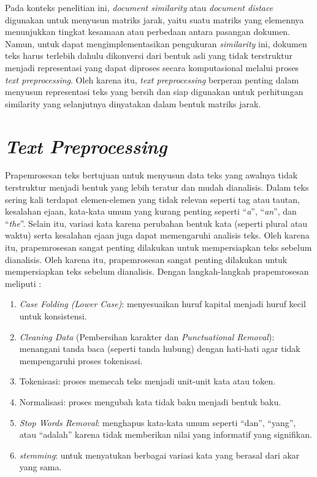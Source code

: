 \documentclass[a4paper,12pt]{report}
\numberwithin{equation}{chapter}
\begin{document}
Pada konteks penelitian ini, \textit{document similarity} atau \textit{document distace} digunakan untuk menyusun matriks jarak, yaitu suatu matriks yang elemennya menunjukkan tingkat kesamaan atau perbedaan antara pasangan dokumen. Namun, untuk dapat mengimplementasikan pengukuran \textit{similarity} ini, dokumen teks harus terlebih dahulu dikonversi dari bentuk asli yang tidak terstruktur menjadi representasi yang dapat diproses secara komputasional melalui proses \textit{text preprocessing}. Oleh karena itu, \textit{text preprocessing} berperan penting dalam menyusun representasi teks yang bersih dan siap digunakan untuk perhitungan similarity yang selanjutnya dinyatakan dalam bentuk matriks jarak.


\section{\textit{Text Preprocessing
}}
\label{sec:Preparasi Teks}
Prapemrosesan teks bertujuan untuk menyusun data teks yang awalnya tidak terstruktur menjadi bentuk yang lebih teratur dan mudah dianalisis. Dalam teks sering kali terdapat elemen-elemen yang tidak relevan seperti tag atau tautan, kesalahan ejaan, kata-kata umum yang kurang penting seperti ``\textit{a}'', ``\textit{an}'', dan ``\textit{the}''. Selain itu, variasi kata karena perubahan bentuk kata (seperti plural atau waktu) serta kesalahan ejaan juga dapat memengaruhi analisis teks. Oleh karena itu, prapemrosesan sangat penting dilakukan untuk mempersiapkan teks sebelum dianalisis. Oleh karena itu, prapemrosesan sangat penting dilakukan untuk mempersiapkan teks sebelum dianalisis. Dengan langkah-langkah prapemrosesan meliputi \citep{CharuC.Aggarwal2018MachineLearningforText}:
\begin{enumerate}
    \item \textit{Case Folding (Lower Case)}: menyesuaikan huruf kapital menjadi huruf kecil untuk konsistensi.
    \item \textit{Cleaning Data} (Pembersihan karakter dan \textit{Punctuational Removal}): menangani tanda baca (seperti tanda hubung) dengan hati-hati agar tidak mempengaruhi proses tokenisasi.
    \item Tokenisasi: proses memecah teks menjadi unit-unit kata atau token.  
    \item Normalisasi: proses mengubah kata tidak baku menjadi bentuk baku.
    \item \textit{Stop Words Removal}: menghapus kata-kata umum seperti ``dan'', ``yang'', atau ``adalah'' karena tidak memberikan nilai yang informatif yang signifikan. 
    \item \textit{stemming}: untuk menyatukan berbagai variasi kata yang berasal dari akar yang sama.
\end{enumerate}
\end{document}
